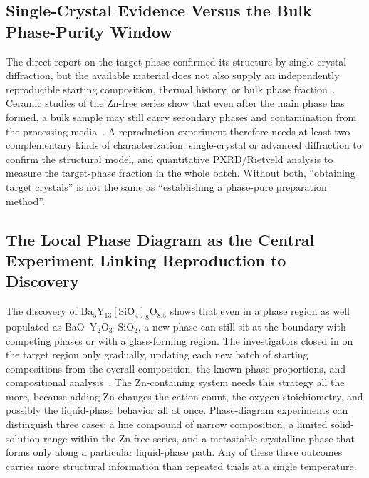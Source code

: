 \subsection{Single-Crystal Evidence Versus the Bulk Phase-Purity Window}

The direct report on the target phase confirmed its structure by single-crystal diffraction, but the available material does not also supply an independently reproducible starting composition, thermal history, or bulk phase fraction~\cite{ababaikeri2024ba5y12zn}. Ceramic studies of the Zn-free series show that even after the main phase has formed, a bulk sample may still carry secondary phases and contamination from the processing media~\cite{yamane2024microstructure,gulay2024navigation}. A reproduction experiment therefore needs at least two complementary kinds of characterization: single-crystal or advanced diffraction to confirm the structural model, and quantitative PXRD\slash Rietveld analysis to measure the target-phase fraction in the whole batch. Without both, ``obtaining target crystals'' is not the same as ``establishing a phase-pure preparation method''.

\subsection{The Local Phase Diagram as the Central Experiment Linking Reproduction to Discovery}

The discovery of $\mathrm{Ba_5Y_{13}[SiO_4]_8O_{8.5}}$ shows that even in a phase region as well populated as BaO--Y$_2$O$_3$--SiO$_2$, a new phase can still sit at the boundary with competing phases or with a glass-forming region. The investigators closed in on the target region only gradually, updating each new batch of starting compositions from the overall composition, the known phase proportions, and compositional analysis~\cite{gulay2024navigation}. The Zn-containing system needs this strategy all the more, because adding Zn changes the cation count, the oxygen stoichiometry, and possibly the liquid-phase behavior all at once. Phase-diagram experiments can distinguish three cases: a line compound of narrow composition, a limited solid-solution range within the Zn-free series, and a metastable crystalline phase that forms only along a particular liquid-phase path. Any of these three outcomes carries more structural information than repeated trials at a single temperature.
